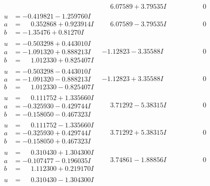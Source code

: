 \documentclass[1p]{elsarticle_modified}
\theoremstyle{definition}
\begin{document}
$$\begin{array}{c|c|c}
 & \phantom{-}6.07589 + 3.79535 I & \phantom{-0.000000 } 0 \\ \hline\begin{aligned}
u &= -0.419821 - 1.259760 I \\
a &= \phantom{-}0.352868 + 0.923914 I \\
b &= -1.35476 + 0.81270 I\end{aligned}
 & \phantom{-}6.07589 - 3.79535 I & \phantom{-0.000000 } 0 \\ \hline\begin{aligned}
u &= -0.503298 + 0.443010 I \\
a &= -1.091320 + 0.888213 I \\
b &= \phantom{-}1.012330 + 0.825407 I\end{aligned}
 & -1.12823 - 3.35588 I & \phantom{-0.000000 } 0 \\ \hline\begin{aligned}
u &= -0.503298 - 0.443010 I \\
a &= -1.091320 - 0.888213 I \\
b &= \phantom{-}1.012330 - 0.825407 I\end{aligned}
 & -1.12823 + 3.35588 I & \phantom{-0.000000 } 0 \\ \hline\begin{aligned}
u &= \phantom{-}0.111752 + 1.335660 I \\
a &= -0.325930 - 0.429744 I \\
b &= -0.158050 - 0.467323 I\end{aligned}
 & \phantom{-}3.71292 - 5.38315 I & \phantom{-0.000000 } 0 \\ \hline\begin{aligned}
u &= \phantom{-}0.111752 - 1.335660 I \\
a &= -0.325930 + 0.429744 I \\
b &= -0.158050 + 0.467323 I\end{aligned}
 & \phantom{-}3.71292 + 5.38315 I & \phantom{-0.000000 } 0 \\ \hline\begin{aligned}
u &= \phantom{-}0.310430 + 1.304300 I \\
a &= -0.107477 - 0.196035 I \\
b &= \phantom{-}1.112300 + 0.219170 I\end{aligned}
 & \phantom{-}3.74861 - 1.88856 I & \phantom{-0.000000 } 0 \\ \hline\begin{aligned}
u &= \phantom{-}0.310430 - 1.304300 I \\

\end{aligned}
\end{array}$$
\end{document}
